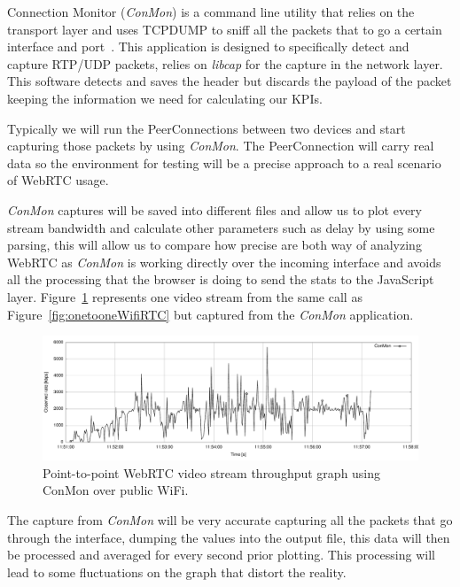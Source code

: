 Connection Monitor ({\it ConMon}) is a command line utility that relies on the transport layer and uses TCPDUMP to sniff all the packets that to go a certain interface and port~\cite{singhConMon}. This application is designed to specifically detect and capture RTP/UDP packets, relies on {\it libcap} for the capture in the network layer. This software detects and saves the header but discards the payload of the packet keeping the information we need for calculating our KPIs.

Typically we will run the PeerConnections between two devices and start capturing those packets by using {\it ConMon}. The PeerConnection will carry real data so the environment for testing will be a precise approach to a real scenario of WebRTC usage.

{\it ConMon} captures will be saved into different files and allow us to plot every stream bandwidth and calculate other parameters such as delay by using some parsing, this will allow us to compare how precise are both way of analyzing WebRTC as {\it ConMon} is working directly over the incoming interface and avoids all the processing that the browser is doing to send the stats to the JavaScript layer. Figure~\ref{fig:onetooneWifiRTCConMon} represents one video stream from the same call as Figure~\ref{fig:onetooneWifiRTC} but captured from the {\it ConMon} application.

 \begin{figure}[h]
  \centering
    \includegraphics[width=1\textwidth]{./figures/onetooneWiFiConMon.pdf}
      \caption[Point-to-point WebRTC video stream throughput graph using ConMon over public WiFi]{Point-to-point WebRTC video stream throughput graph using ConMon over public WiFi.}
	\label{fig:onetooneWifiRTCConMon}
\end{figure}

The capture from {\it ConMon} will be very accurate capturing all the packets that go through the interface, dumping the values into the output file, this data will then be processed and averaged for every second prior plotting. This processing will lead to some fluctuations on the graph that distort the reality.


